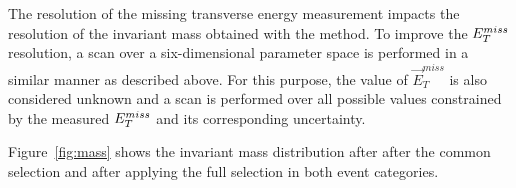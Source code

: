 The resolution of the missing transverse energy measurement impacts the resolution of the invariant mass obtained with the \mmc method.
To improve the $E_{T}^{miss}$ resolution, a scan over a six-dimensional parameter space is performed 
in a similar manner as described above. For this purpose, the value of $\vec{E}_T^{miss}$ is also considered unknown and a scan 
is performed over all possible values constrained by the measured $E_{T}^{miss}$ and its corresponding uncertainty.
%

Figure~\ref{fig:mass} shows the  \mmc invariant mass distribution after after the common selection 
and after applying the full selection in both event categories. 

 


